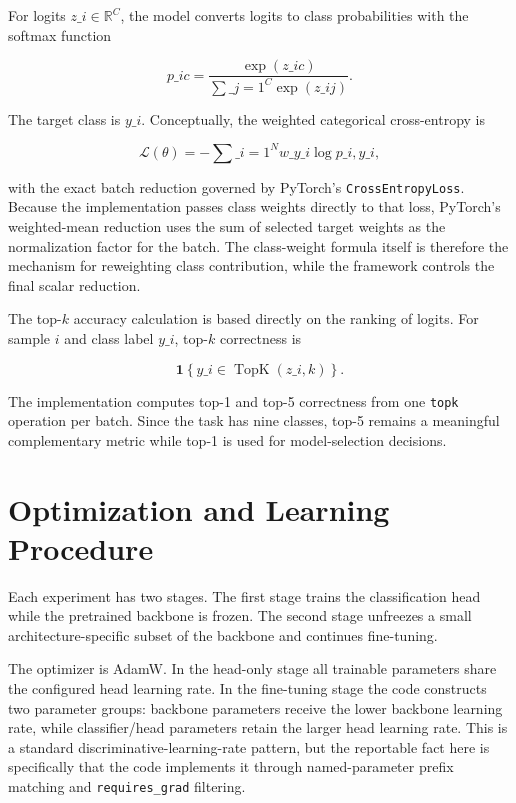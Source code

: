 \documentclass[11pt,a4paper]{article}
\begin{document}
For logits $z\_i \in \mathbb{R}^{C}$, the model converts logits to class probabilities with the softmax function

\begin{equation}
p\_{ic}=\frac{\exp(z\_{ic})}{\sum\_{j=1}^{C}\exp(z\_{ij})}.
\end{equation}

The target class is $y\_i$. Conceptually, the weighted categorical cross-entropy is

\begin{equation}
\mathcal{L}(\theta) =
-\sum\_{i=1}^{N} w\_{y\_i}\log p\_{i,y\_i},
\end{equation}

with the exact batch reduction governed by PyTorch's \texttt{CrossEntropyLoss}. Because the implementation passes class weights directly to that loss, PyTorch's weighted-mean reduction uses the sum of selected target weights as the normalization factor for the batch. The class-weight formula itself is therefore the mechanism for reweighting class contribution, while the framework controls the final scalar reduction.

The top-$k$ accuracy calculation is based directly on the ranking of logits. For sample $i$ and class label $y\_i$, top-$k$ correctness is

\begin{equation}
\mathbf{1}\!\left\{y\_i \in \operatorname{TopK}(z\_i,k)\right\}.
\end{equation}

The implementation computes top-1 and top-5 correctness from one \texttt{topk} operation per batch. Since the task has nine classes, top-5 remains a meaningful complementary metric while top-1 is used for model-selection decisions.

\section{Optimization and Learning Procedure}
Each experiment has two stages. The first stage trains the classification head while the pretrained backbone is frozen. The second stage unfreezes a small architecture-specific subset of the backbone and continues fine-tuning.

The optimizer is AdamW. In the head-only stage all trainable parameters share the configured head learning rate. In the fine-tuning stage the code constructs two parameter groups: backbone parameters receive the lower backbone learning rate, while classifier/head parameters retain the larger head learning rate. This is a standard discriminative-learning-rate pattern, but the reportable fact here is specifically that the code implements it through named-parameter prefix matching and \texttt{requires\_grad} filtering.
\end{document}
